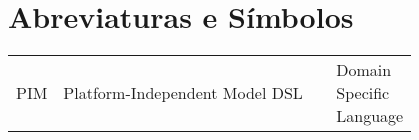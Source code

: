 \chapter*{Abreviaturas e Símbolos}

\begin{flushleft}
\begin{tabular}{l p{0.8\linewidth}}
PIM       & Platform-Independent Model
DSL       & Domain Specific Language
\end{tabular}
\end{flushleft}

